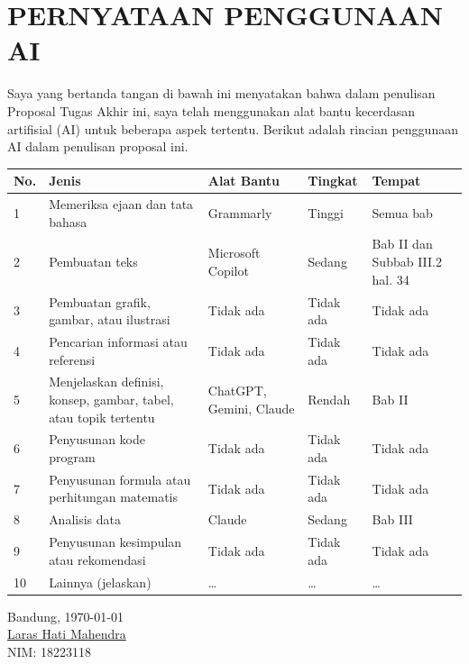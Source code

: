 \chapter*{PERNYATAAN PENGGUNAAN AI}
\vspace{1.5cm}

Saya yang bertanda tangan di bawah ini menyatakan bahwa dalam penulisan Proposal Tugas Akhir ini, saya telah menggunakan alat bantu kecerdasan artifisial (AI) untuk beberapa aspek tertentu. Berikut adalah rincian penggunaan AI dalam penulisan proposal ini.

\begin{table}[h]
\centering
\small
\begin{tabular}{|p{0.5cm}|p{3.8cm}|p{2.9cm}|p{2.1cm}|p{3.2cm}|}
\hline
\textbf{No.} & \textbf{Jenis} & \textbf{Alat Bantu} & \textbf{Tingkat} & \textbf{Tempat} \\
\hline
1 & Memeriksa ejaan dan tata bahasa & Grammarly & Tinggi & Semua bab \\
\hline
2 & Pembuatan teks & Microsoft Copilot & Sedang & Bab II dan Subbab III.2 hal. 34 \\
\hline
3 & Pembuatan grafik, gambar, atau ilustrasi & Tidak ada & Tidak ada & Tidak ada \\
\hline
4 & Pencarian informasi atau referensi & Tidak ada & Tidak ada & Tidak ada \\
\hline
5 & Menjelaskan definisi, konsep, gambar, tabel, atau topik tertentu & ChatGPT, Gemini, Claude & Rendah & Bab II \\
\hline
6 & Penyusunan kode program & Tidak ada & Tidak ada & Tidak ada \\
\hline
7 & Penyusunan formula atau perhitungan matematis & Tidak ada & Tidak ada & Tidak ada \\
\hline
8 & Analisis data & Claude & Sedang & Bab III \\
\hline
9 & Penyusunan kesimpulan atau rekomendasi & Tidak ada & Tidak ada & Tidak ada \\
\hline
10 & Lainnya (jelaskan) & \ldots & \ldots & \ldots \\
\hline
\end{tabular}
\end{table}

\vspace{1.0cm}
Bandung, \today\\[1.5cm]

\underline{Laras Hati Mahendra} \\
NIM: 18223118